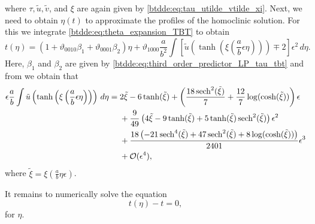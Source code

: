 where $\tau, \tilde u, \tilde v$, and $\xi$ are again given by \cref{btdde:eq:tau_utilde_vtilde_xi}.
Next, we need to obtain $\eta(t)$ to approximate the profiles of the homoclinic solution. For
this we integrate \cref{btdde:eq:theta_expansion_TBT} to obtain
\[
t(\eta) = \left(1  + \vartheta_{0010} \beta_1 + \vartheta_{0001} \beta_2 \right)\eta  + \vartheta_{1000} \frac a{b^2} \int \left[ \tilde {u}\left(\tanh\left(\xi\left(\frac{a}{b}\epsilon\eta\right)\right)\right) \mp 2 \right] \epsilon^2 \, d\eta.
\]
Here, $\beta_1$ and $\beta_2$ are given by \cref{btdde:eq:third_order_predictor_LP_tau_tbt} and from \cite{Bosschaert@Interplay} we obtain that
\begin{equation}
\label{btdde:eq:int_u_s_regular_perturbation}
\begin{aligned}
\epsilon \frac a b \int
\tilde {u}\left(\tanh\left(\xi\left(\frac{a}{b}\epsilon\eta\right)\right)\right) \, d\eta
={}& 2 \tilde\xi -6 \tanh (\tilde\xi ) + 
     \left( \frac{18 \operatorname{sech}^2(\tilde\xi )}{7}+\frac{12}{7} \log (\cosh (\tilde\xi ))
		 \right) \epsilon \\ &+
		 \frac{9}{49} \left(4 \tilde\xi -9 \tanh (\tilde\xi )+5 \tanh (\tilde\xi ) \operatorname{sech}^2(\tilde\xi
		 )\right) \epsilon^2 \\ &+
		 \frac{18 \left(-21 \operatorname{sech}^4(\tilde\xi )+47 \operatorname{sech}^2(\tilde\xi )+8 \log (\cosh
		 (\tilde\xi ))\right)}{2401} \epsilon^3  \\
                                &+ \mathcal{O}(\epsilon^4),
\end{aligned}
\end{equation}
where $\tilde\xi = \xi(\frac{a}{b}\eta\epsilon)$. 

It remains to numerically solve the equation 
\begin{equation*}
    t(\eta) - t = 0,
\end{equation*}
for $\eta$.

